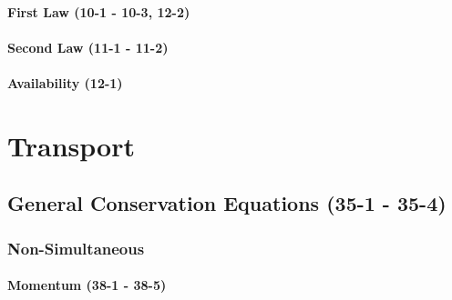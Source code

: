 \documentclass{mitqualif}
\begin{document}
\subsubsection{First Law (10-1 - 10-3, 12-2)}




\subsubsection{Second Law (11-1 - 11-2)}


\subsubsection{Availability (12-1)}

\newpage
\chapter{Transport}
\section{General Conservation Equations (35-1 - 35-4)}





\subsection{Non-Simultaneous}
\subsubsection{Momentum (38-1 - 38-5)}






































\end{document}
